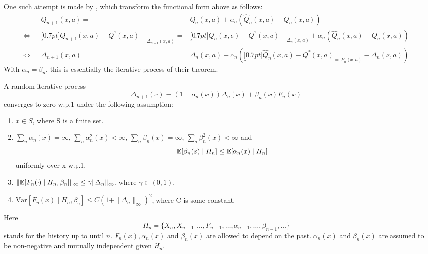 One such attempt is made by \textcite{jaakkolaConvergenceStochasticIterative1994a}, which transform the functional form above as follows:
\begin{align*}
    &&Q_{n+1}(x,a)
    =&Q_n(x,a) + \alpha_n(\hat{Q}_n (x,a)-Q_n(x,a))
    \\
    \iff
    && \underbracket[0.7pt]{Q_{n+1}(x,a) -Q^*(x,a)}_{\eqqcolon\Delta_{n+1}(x,a)} 
    =&\underbracket[0.7pt]{Q_n(x,a)-Q^*(x,a) }_{\eqqcolon\Delta_n(x,a)}
    + \alpha_n(\hat{Q}_n (x,a)-Q_n(x,a))\\
    \iff&& \Delta_{n+1}(x,a) =&\Delta_n(x,a) +\alpha_n 
    (\underbracket[0.7pt]{\hat{Q}_n (x,a)-Q^*(x,a)}_{
        \eqqcolon F_n(x,a)
    }-\Delta_n(x,a))
\end{align*} 
With \(\alpha_n=\beta_n\), this is essentially the iterative process of their theorem.

\begin{thm}\label{JAAKKOLA:THM}
    A random iterative process
    \[
        \Delta_{n+1}(x)=(1-\alpha_n(x)) \Delta_n(x) +\beta_n(x) F_n(x)
    \]
    converges to zero w.p.1 under the following assumption:
    \begin{enumerate}
        \item\label{Jaakkola:1} \(x\in S\), where S is a finite set.
        \item\label{Jaakkola:2} \(\sum_n \alpha_n(x)=\infty\), \(\sum_n \alpha_n^2(x) <\infty\), \(\sum_n\beta_n(x)=\infty\), \(\sum_n \beta_n^2 (x)<\infty\) and
        \[
            \mathbb{E}[\beta_n(x)\mid H_n]\le \mathbb{E}[\alpha_n(x)\mid H_n]
        \]
        uniformly over x w.p.1.
        \item\label{Jaakkola:3} \(\|\mathbb{E}[F_n(\cdot)\mid H_n,\beta_n]\|_\infty \le \gamma \|\Delta_n\|_\infty\), where \(\gamma \in (0,1) \).
        \item\label{Jaakkola:4} \(\text{Var}[F_n(x)\mid H_n,\beta_n]\le C(1+\|\Delta_n\|_\infty)^2\), where C is some constant.
    \end{enumerate}
    Here
    \[
        H_n=\{X_n, X_{n-1}, \dots, F_{n-1}, \dots, \alpha_{n-1},\dots, \beta_{n-1},\dots\}
    \]
    stands for the history up to until \(n\). \(F_n(x), \alpha_n(x)\) and \(\beta_n(x)\) are allowed to depend on the past. \(\alpha_n(x)\) and \(\beta_n(x)\) are assumed to be non-negative and mutually independent given \(H_n\).
\end{thm}

